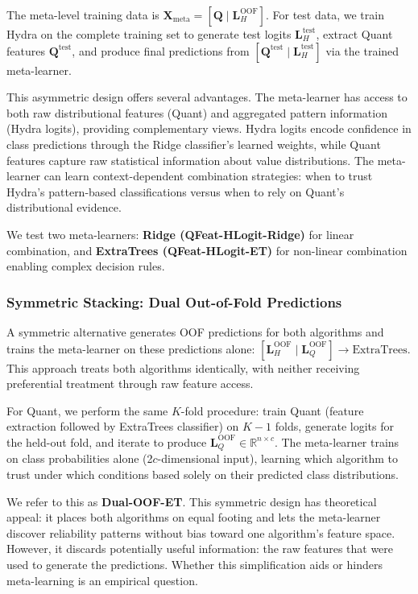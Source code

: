 \documentclass[pdflatex,sn-basic]{sn-jnl}           %
\theoremstyle{thmstyleone}%
\theoremstyle{thmstyletwo}%
\theoremstyle{thmstylethree}%
\begin{document}
The meta-level training data is $\mathbf{X}_{\text{meta}} = [\mathbf{Q} \mid \mathbf{L}_H^{\text{OOF}}]$. For test data, we train Hydra on the complete training set to generate test logits $\mathbf{L}_H^{\text{test}}$, extract Quant features $\mathbf{Q}^{\text{test}}$, and produce final predictions from $[\mathbf{Q}^{\text{test}} \mid \mathbf{L}_H^{\text{test}}]$ via the trained meta-learner.

This asymmetric design offers several advantages. The meta-learner has access to both raw distributional features (Quant) and aggregated pattern information (Hydra logits), providing complementary views. Hydra logits encode confidence in class predictions through the Ridge classifier's learned weights, while Quant features capture raw statistical information about value distributions. The meta-learner can learn context-dependent combination strategies: when to trust Hydra's pattern-based classifications versus when to rely on Quant's distributional evidence.

We test two meta-learners: \textbf{Ridge (QFeat-HLogit-Ridge)} for linear combination, and \textbf{ExtraTrees (QFeat-HLogit-ET)} for non-linear combination enabling complex decision rules.

\subsubsection{Symmetric Stacking: Dual Out-of-Fold Predictions}

A symmetric alternative generates OOF predictions for both algorithms and trains the meta-learner on these predictions alone: $[\mathbf{L}_H^{\text{OOF}} \mid \mathbf{L}_Q^{\text{OOF}}] \rightarrow \text{ExtraTrees}$. This approach treats both algorithms identically, with neither receiving preferential treatment through raw feature access.

For Quant, we perform the same $K$-fold procedure: train Quant (feature extraction followed by ExtraTrees classifier) on $K-1$ folds, generate logits for the held-out fold, and iterate to produce $\mathbf{L}_Q^{\text{OOF}} \in \mathbb{R}^{n \times c}$. The meta-learner trains on class probabilities alone (2$c$-dimensional input), learning which algorithm to trust under which conditions based solely on their predicted class distributions.

We refer to this as \textbf{Dual-OOF-ET}. This symmetric design has theoretical appeal: it places both algorithms on equal footing and lets the meta-learner discover reliability patterns without bias toward one algorithm's feature space. However, it discards potentially useful information: the raw features that were used to generate the predictions. Whether this simplification aids or hinders meta-learning is an empirical question.
\end{document}
